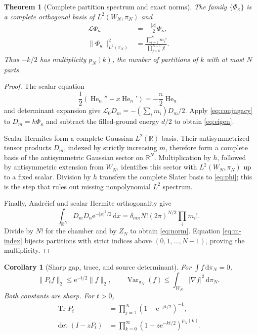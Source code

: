 \documentclass[10pt]{article}
\newcommand{\RR}{\mathbb R}
\newcommand{\e}{\mathrm e}
\newcommand{\dd}{\,\mathrm d}
\newcommand{\Tr}{\operatorname{Tr}}
\newcommand{\Var}{\operatorname{Var}}
\newtheorem{theorem}{Theorem}
\newtheorem{corollary}{Corollary}
\begin{document}
\begin{theorem}[Complete partition spectrum and exact norms]
The family $\{\Phi_\kappa\}$ is a complete orthogonal basis of
$L^2(W_N,\pi_N)$ and
\begin{align}
 \mathcal L\Phi_\kappa&=-\frac{|\kappa|}{2}\Phi_\kappa,
                                                        \label{eq:eigen}\\
 \|\Phi_\kappa\|_{L^2(\pi_N)}^2
 &=\frac{\prod_{i=1}^N m_i!}{\prod_{j=0}^{N-1}j!}.     \label{eq:norm}
\end{align}
Thus $-k/2$ has multiplicity $p_N(k)$, the number of partitions of $k$ with
at most $N$ parts.
\end{theorem}

\begin{proof}
The scalar equation
\begin{equation}
 \frac12(\operatorname{He}_n''-x\operatorname{He}_n')
 =-\frac n2\operatorname{He}_n                           \label{eq:hermite}
\end{equation}
and determinant expansion give
$\mathcal L_0D_m=-(\sum_i m_i)D_m/2$.  Apply
\eqref{eq:conjugacy} to $D_m=h\Phi_\kappa$ and subtract the filled-ground
energy $d/2$ to obtain \eqref{eq:eigen}.

Scalar Hermites form a complete Gaussian $L^2(\RR)$ basis.  Their
antisymmetrized tensor products $D_m$, indexed by strictly increasing $m$,
therefore form a complete basis of the antisymmetric Gaussian sector on
$\RR^N$.  Multiplication by $h$, followed by antisymmetric extension from
$W_N$, identifies this sector with $L^2(W_N,\pi_N)$ up to a fixed scalar.
Division by $h$ transfers the complete Slater basis to \eqref{eq:phi}; this is
the step that rules out missing nonpolynomial $L^2$ spectrum.

Finally, Andr\'eief and scalar Hermite orthogonality give
\begin{equation}
 \int_{\RR^N}D_mD_n\e^{-|x|^2/2}\dd x
 =\delta_{mn}N!(2\pi)^{N/2}\prod_i m_i!.              \label{eq:slater-norm}
\end{equation}
Divide by $N!$ for the chamber and by $Z_N$ to obtain \eqref{eq:norm}.
Equation \eqref{eq:m-index} bijects partitions with strict indices above
$(0,1,\ldots,N-1)$, proving the multiplicity.
\end{proof}

\begin{corollary}[Sharp gap, trace, and source determinant]
For $\int f\dd\pi_N=0$,
\begin{equation}
 \|P_tf\|_2\leq\e^{-t/2}\|f\|_2,
 \qquad
 \Var_{\pi_N}(f)\leq\int_{W_N}|\nabla f|^2\dd\pi_N.   \label{eq:poincare}
\end{equation}
Both constants are sharp.  For $t>0$,
\begin{align}
 \Tr P_t&=\prod_{j=1}^N(1-\e^{-jt/2})^{-1},            \label{eq:trace}\\
 \det(I-zP_t)&=\prod_{k=0}^{\infty}
 (1-z\e^{-kt/2})^{p_N(k)}.                            \label{eq:fredholm}
\end{align}
\end{corollary}
\end{document}
